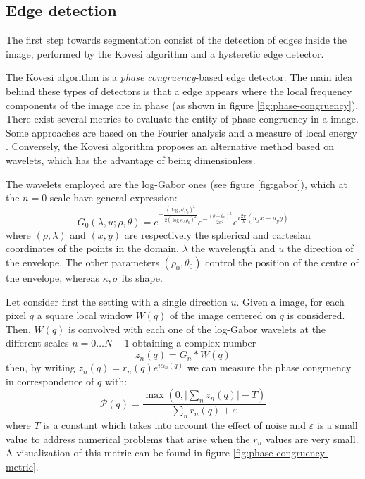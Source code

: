     \subsection{Edge detection}\label{subsection:contour_detection}
        \par{
            The first step towards segmentation consist of the detection of edges inside the image, performed by the Kovesi algorithm and a hysteretic edge detector.
        }
        \par{
            The Kovesi algorithm \cite{mit:kovesiphase, googlescholar:kovesiphase} is a  \emph{phase congruency}-based edge detector. The main idea behind these types of detectors is that a edge appears where the local frequency components of the image are in phase (as shown in figure \ref{fig:phase-congruency}). There exist several metrics to evaluate the entity of phase congruency in a image. Some approaches are based on the Fourier analysis and a measure of local energy \cite{researchgate:phase}. Conversely, the Kovesi algorithm proposes an alternative method based on wavelets, which has the advantage of being dimensionless.
        }
    	\par{
    		The wavelets employed are the log-Gabor ones (see figure \ref{fig:gabor}), which at the $n=0$ scale have general expression:
    		\begin{equation*}
	    		G_0(\lambda, u; \rho, \theta) = e^{-\frac{(\log\rho/\rho_0)^2}{2(\log\kappa/\rho_0)^2}} e^{-\frac{(\theta-\theta_0)^2}{2\sigma^2}} e^{i\frac{2\pi}{\lambda} (u_x x + u_y y)}
    		\end{equation*}
    		where $(\rho,\lambda)$ and $(x,y)$ are respectively the spherical and cartesian coordinates of the points in the domain, $\lambda$ the wavelength and $u$ the direction of the envelope. The other parameters $(\rho_0, \theta_0)$ control the position of the centre of the envelope, whereas $\kappa, \sigma$ its shape.
	    }
		\par{
			Let consider first the setting with a single direction $u$. Given a image, for each pixel $q$ a square local window $W(q)$ of the image centered on $q$ is considered. Then, $W(q)$ is convolved with each one of the log-Gabor wavelets at the different scales $n = 0 \dots N-1$ obtaining a complex number
	    	\begin{equation*}
	    		z_{n} (q) = G_{n} * W(q)
	    	\end{equation*}
	    	then, by writing $z_{n} (q) = r_{n} (q) e^{i \alpha_{n} (q)}$ we can measure the phase congruency in correspondence of $q$ with:
            \begin{equation*}
	            \mathcal{P} (q) = \frac{\max(0,\lvert \sum_{n} z_{n} (q) \rvert - T)}{\sum_{n} r_{n} (q) + \varepsilon}
            \end{equation*}
            where $T$ is a constant which takes into account the effect of noise and $\varepsilon$ is a small value to address numerical problems that arise when the $r_n$ values are very small. A visualization of this metric can be found in figure \ref{fig:phase-congruency-metric}.
        }
